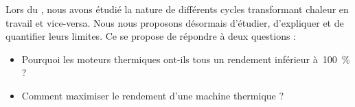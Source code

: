 Lors du \courssix, nous avons étudié la nature de différents cycles transformant chaleur en travail et vice-versa. Nous nous proposons désormais d’étudier, d’expliquer et de quantifier leurs limites. Ce \courssept se propose de répondre à deux questions :
\begin{itemize}
	\item Pourquoi les moteurs thermiques ont-ils tous un rendement inférieur à~\SI{100}{\percent} ?
	\item Comment maximiser le rendement d’une machine thermique ?
\end{itemize}
